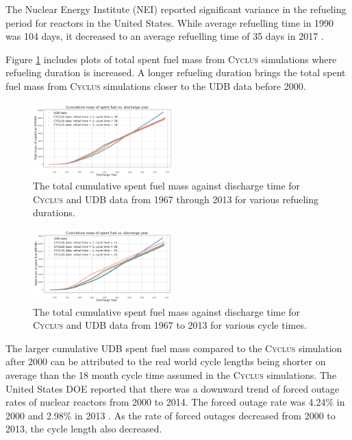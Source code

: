 \documentclass{anstrans}
\newcommand{\Cyclus}{\textsc{Cyclus}\xspace}%
\begin{document}
The Nuclear Energy Institute (NEI) reported significant 
variance in the refueling period for reactors in the United States. While average 
refuelling time in 1990 was 104 days, it decreased to an average 
refuelling time of 35 days in 2017 \cite{iaea_current_nodate}.

Figure \ref{fig:total_refueltime} includes plots of total spent fuel mass from 
\Cyclus simulations where refueling duration is increased. A longer refueling duration brings 
the total spent fuel mass from \Cyclus simulations closer to the UDB data 
before 2000. 

\begin{figure}[t] 
	\centering
	\includegraphics[width=0.48\textwidth]{figures/total_cumulative_mass_spent_fuel_refueltime}
	\caption{The total cumulative spent fuel mass against discharge time for \Cyclus and UDB data from 1967 through 2013 for various refueling durations.}
	\label{fig:total_refueltime}
\end{figure} 

\begin{figure}[b] %
	\centering
	\includegraphics[width=0.48\textwidth]{figures/total_cumulative_mass_spent_fuel_cycletime}
	\caption{The total cumulative spent fuel mass against discharge time for \Cyclus and UDB data from 1967 to 2013 for various cycle times.}
	\label{fig:total_cycletime}
\end{figure} 

The larger cumulative UDB spent fuel mass compared to the \Cyclus simulation 
after 2000 can be attributed to the real world cycle lengths being shorter on 
average than the 18 month cycle time assumed in the  \Cyclus simulations. The 
United States DOE reported that there was a downward trend of forced outage 
rates of nuclear reactors from 2000 to 2014. The forced outage rate was 4.24\% 
in 2000 and 2.98\% in 2013 \cite{gehin_nuclear_2016}. As the rate of forced 
outages decreased from 2000 to 2013, the cycle length also decreased. 
\end{document}
